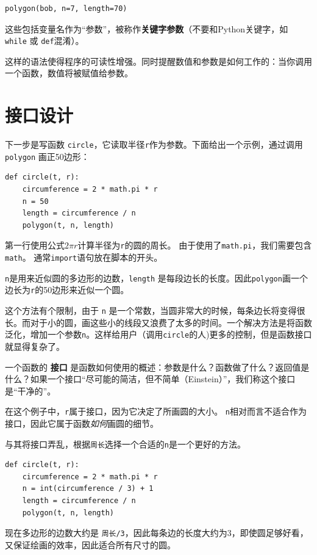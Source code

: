\beforeverb
\begin{verbatim}
polygon(bob, n=7, length=70)
\end{verbatim}
\afterverb
%
这些包括变量名作为“参数”，被称作{\bf 关键字参数}（不要和Python关键字，如 {\tt while} 或 {\tt def}混淆）。


这样的语法使得程序的可读性增强。同时提醒数值和参数是如何工作的：当你调用一个函数，数值将被赋值给参数。


\section{接口设计}

下一步是写函数 {\tt circle}，它读取半径{\tt r}作为参数。下面给出一个示例，通过调用{\tt polygon} 画正50边形：

\beforeverb
\begin{verbatim}
def circle(t, r):
    circumference = 2 * math.pi * r
    n = 50
    length = circumference / n
    polygon(t, n, length)
\end{verbatim}
\afterverb
%
第一行使用公式$2 \pi r$计算半径为{\tt r}的圆的周长。 由于使用了{\tt math.pi}，我们需要包含 {\tt math}。 通常{\tt import}语句放在脚本的开头。


{\tt n}是用来近似圆的多边形的边数，{\tt length} 是每段边长的长度。因此{\tt polygon}画一个边长为{\tt r}的50边形来近似一个圆。

这个方法有个限制，由于 {\tt n} 是一个常数，当圆非常大的时候，每条边长将变得很长。而对于小的圆，画这些小的线段又浪费了太多的时间。一个解决方法是将函数泛化，增加一个参数{\tt n}。这样给用户（调用{\tt circle}的人)更多的控制，但是函数接口就显得复杂了。


一个函数的 {\bf 接口} 是函数如何使用的概述：参数是什么？函数做了什么？返回值是什么？如果一个接口“尽可能的简洁，但不简单（Einstein）”，我们称这个接口是“干净的”。


在这个例子中，{\tt r}属于接口，因为它决定了所画圆的大小。 {\tt n}相对而言不适合作为接口，因此它属于函数{\em 如何}画圆的细节。

与其将接口弄乱，根据{\tt 周长}选择一个合适的{\tt n}是一个更好的方法。

\beforeverb
\begin{verbatim}
def circle(t, r):
    circumference = 2 * math.pi * r
    n = int(circumference / 3) + 1
    length = circumference / n
    polygon(t, n, length)
\end{verbatim}
\afterverb
%
现在多边形的边数大约是 {\tt 周长/3}，因此每条边的长度大约为3，即使圆足够好看，又保证绘画的效率，因此适合所有尺寸的圆。

